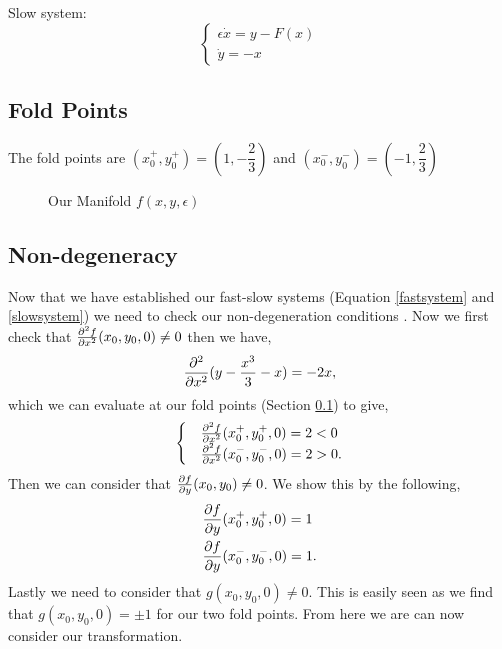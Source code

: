 \documentclass{article}
\begin{document}
Slow system:
\begin{equation}\label{slowsystem}
    \begin{cases} \epsilon \dot{x}=y-F(x)\\
    \dot{y}=-x
    \end{cases}
\end{equation}

\subsection{Fold Points}\label{Fold Points}
The fold points are $(x_0^+,y_0^+)=(1,-\dfrac{2}{3})$ and $(x_0^-,y_0^-)=(-1,\dfrac{2}{3})$
\begin{figure}[h]
    \centering
    \caption{Our Manifold $f(x,y,\epsilon)$}
    \label{fig:my_label}
\end{figure}

\subsection{Non-degeneracy}
Now that we have established our fast-slow systems (Equation \ref{fastsystem} and \ref{slowsystem}) we need to check our non-degeneration conditions \citep{krupa2001}. 
Now we first check that $ \pd{^2f}{x^2}(x_0,y_0,0)\neq 0$ then we have,
\begin{equation}
    \pd{^2}{x^2}(y-\dfrac{x^3}{3}-x)=-2x,
\end{equation}
which we can evaluate at our fold points (Section \ref{Fold Points}) to give,
\begin{equation} 
    \begin{cases}
            &\pd[2]{f}{x}(x_0^+,y_0^+,0)=2<0\\
            &\pd[2]{f}{x}(x_0^-,y_0^-,0)=2>0.
    \end{cases}
\end{equation}
Then we can consider that $\pd{f}{y}(x_0,y_0)\neq 0$. We show this by the following,
\begin{align}
        &\pd{f}{y}(x_0^+,y_0^+,0)=1\\
        &\pd{f}{y}(x_0^-,y_0^-,0)=1.
\end{align}
Lastly we need to consider that $g(x_0,y_0,0)\neq 0$. This is easily seen as we find that $g(x_0,y_0,0)=\pm 1$ for our two fold points. From here we are can now consider our transformation.
\end{document}
